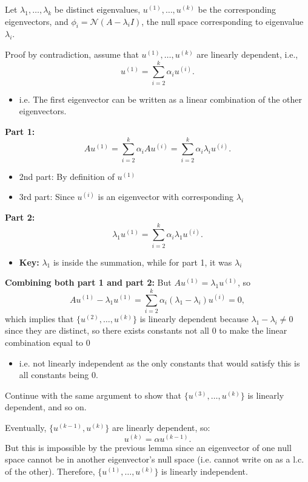 \begin{derivation}
    Let $\lambda_1, \ldots, \lambda_k$ be distinct eigenvalues, $u^{(1)}, \ldots, u^{(k)}$ be the corresponding eigenvectors, and $\phi_i = \mathcal{N}(A - \lambda_i I)$, the null space corresponding to eigenvalue $\lambda_i$.
    \vspace{1em}

    Proof by contradiction, assume that $u^{(1)}, \ldots, u^{(k)}$ are linearly dependent, i.e.,
    \[
    u^{(1)} = \sum_{i=2}^{k} \alpha_i u^{(i)}.
    \]
    \begin{itemize}
        \item i.e. The first eigenvector can be written as a linear combination of the other eigenvectors. 
    \end{itemize}
    \vspace{1em}

    \textbf{Part 1:}
    \[
    A u^{(1)} = \sum_{i=2}^{k} \alpha_i A u^{(i)} = \sum_{i=2}^{k} \alpha_i \lambda_i u^{(i)}.
    \]
    \begin{itemize}
        \item 2nd part: By definition of $u^{(1)}$
        \item 3rd part: Since $u^{(i)}$ is an eigenvector with corresponding $\lambda_i$
    \end{itemize}

    \textbf{Part 2:}
    \[
    \lambda_1 u^{(1)} = \sum_{i=2}^{k} \alpha_i \lambda_1 u^{(i)}.
    \]
    \begin{itemize}
        \item \textbf{Key:} $\lambda_1$ is inside the summation, while for part 1, it was $\lambda_i$
    \end{itemize}
    \vspace{1em}

    \textbf{Combining both part 1 and part 2:}
    But $A u^{(1)} = \lambda_1 u^{(1)}$, so
    \[
    A u^{(1)} - \lambda_1 u^{(1)} =\sum_{i=2}^{k} \alpha_i (\lambda_1 - \lambda_i) u^{(i)} = 0,
    \]
    which implies that $\{u^{(2)}, \ldots, u^{(k)}\}$ is linearly dependent because $\lambda_1 - \lambda_i \neq 0$ since they are distinct, so there exists constants not all 0 to make the linear combination equal to 0 
    \begin{itemize}
        \item i.e. not linearly independent as the only constants that would satisfy this is all constants being $0$.
    \end{itemize}
    \vspace{1em}

    Continue with the same argument to show that $\{u^{(3)}, \ldots, u^{(k)}\}$ is linearly dependent, and so on. 
    \vspace{1em}

    Eventually, $\{u^{(k-1)}, u^{(k)}\}$ are linearly dependent, so:
    \[
    u^{(k)} = \alpha u^{(k-1)}.
    \]
    But this is impossible by the previous lemma since an eigenvector of one null space cannot be in another eigenvector's null space (i.e. cannot write on as a l.c. of the other). Therefore, $\{u^{(1)}, \ldots, u^{(k)}\}$ is linearly independent.    
\end{derivation}

